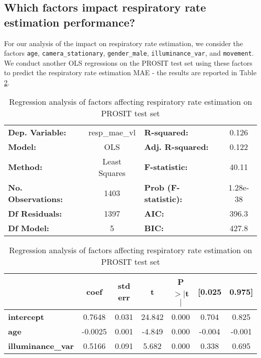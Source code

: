 \documentclass{article}
\begin{document}
\subsection{Which factors impact respiratory rate estimation performance?}

For our analysis of the impact on respiratory rate estimation, we consider the factors \texttt{age}, \texttt{camera\_stationary}, \texttt{gender\_male}, \texttt{illuminance\_var}, and \texttt{movement}.
We conduct another OLS regressions on the PROSIT test set using these factors to predict the respiratory rate estimation MAE - the results are reported in Table \ref{tab:vv-rr-regression-prosit}.

\begin{table}[h!]
\begin{center}
\caption{Regression analysis of factors affecting respiratory rate estimation on PROSIT test set}
\label{tab:vv-rr-regression-prosit}
\begin{tabular}{lclc}
\toprule
\textbf{Dep. Variable:}          &  resp\_mae\_vl   & \textbf{  R-squared:         } &     0.126   \\
\textbf{Model:}                  &       OLS        & \textbf{  Adj. R-squared:    } &     0.122   \\
\textbf{Method:}                 &  Least Squares   & \textbf{  F-statistic:       } &     40.11   \\
\textbf{No. Observations:}       &        1403      & \textbf{  Prob (F-statistic):} &  1.28e-38   \\
\textbf{Df Residuals:}           &        1397      & \textbf{  AIC:               } &     396.3   \\
\textbf{Df Model:}               &           5      & \textbf{  BIC:               } &     427.8   \\
\bottomrule
\end{tabular}
\begin{tabular}{lcccccc}
                                 & \textbf{coef} & \textbf{std err} & \textbf{t} & \textbf{P$> |$t$|$} & \textbf{[0.025} & \textbf{0.975]}  \\
\midrule
\textbf{intercept}               &       0.7648  &        0.031     &    24.842  &         0.000        &        0.704    &        0.825     \\
\textbf{age}                     &      -0.0025  &        0.001     &    -4.849  &         0.000        &       -0.004    &       -0.001     \\
\textbf{illuminance\_var}        &       0.5166  &        0.091     &     5.682  &         0.000        &        0.338    &        0.695     \\

\end{tabular}
\end{center}
\end{table}
\end{document}
